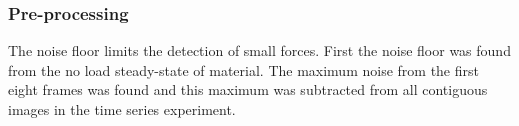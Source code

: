 
\subsubsection{Pre-processing}\label{Pre-processing2}
The noise floor limits the detection of small forces. First the noise floor was found from the no load steady-state of material. The maximum noise from the first eight frames was found and this maximum was subtracted from all contiguous images in the time series experiment.

